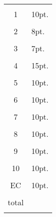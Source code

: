 \begin{center}
\begin{tabular}{|c|l|} \hline
\hspace{1in} & \hspace{1in} \\
1 & 10pt. \\ 
&  \\ \hline
2 & 8pt. \\
&  \\ \hline
3 & 7pt. \\
&  \\ \hline
4 & 15pt.\\
&  \\ \hline
5 & 10pt.\\
&  \\ \hline
6 & 10pt.\\
&  \\ \hline
7 & 10pt.\\
&  \\ \hline
8 & 10pt.\\
&  \\ \hline
9 & 10pt. \\
& \\ \hline
10 & 10pt. \\
& \\ \hline
EC & 10pt. \\
& \\ \hline
total & \\
& \\ \hline
\end{tabular}
\end{center}

\pagebreak
